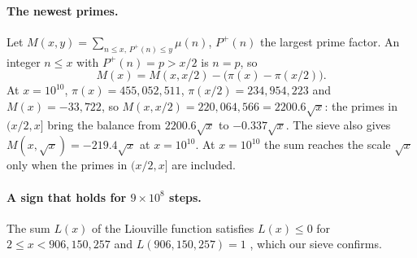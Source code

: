 \documentclass[11pt]{article}
\theoremstyle{definition}\newtheorem{definition}[theorem]{Definition}
\theoremstyle{remark}\newtheorem{remark}[theorem]{Remark}
\begin{document}
\paragraph{The newest primes.} Let $M(x,y)=\sum_{n\le x,\,P^+(n)\le y}\mu(n)$, $P^+(n)$ the largest prime factor. An integer $n\le x$ with $P^+(n)=p>x/2$ is $n=p$, so
\[
M(x)=M(x,x/2)-\bigl(\pi(x)-\pi(x/2)\bigr).
\]
At $x=10^{10}$, $\pi(x)=455{,}052{,}511$, $\pi(x/2)=234{,}954{,}223$ and $M(x)=-33{,}722$, so $M(x,x/2)=220{,}064{,}566=2200.6\sqrt x$: the primes in $(x/2,x]$ bring the balance from $2200.6\sqrt x$ to $-0.337\sqrt x$. The sieve also gives $M(x,\sqrt x)=-219.4\sqrt x$ at $x=10^{10}$. At $x=10^{10}$ the sum reaches the scale $\sqrt x$ only when the primes in $(x/2,x]$ are included.

\paragraph{A sign that holds for $9\times10^8$ steps.} The sum $L(x)$ of the Liouville function satisfies $L(x)\le0$ for $2\le x<906{,}150{,}257$ and $L(906{,}150{,}257)=1$ \cite{Tanaka}, which our sieve confirms.
\end{document}
